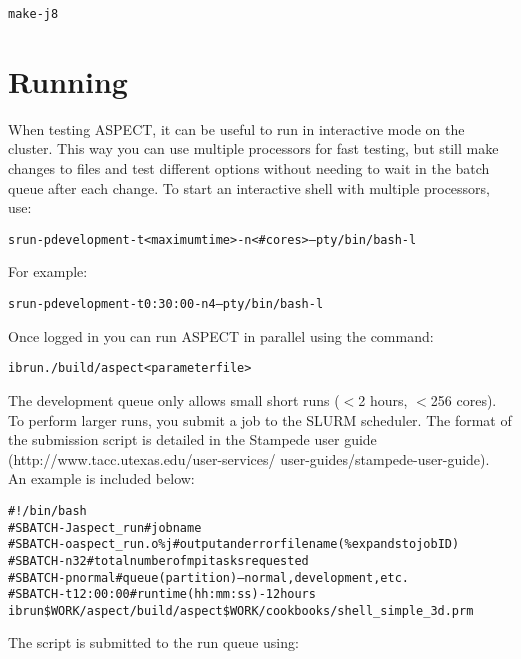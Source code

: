 \documentclass[12pt]{article}
\begin{document}
 \begin{alltt}\footnotesize
make -j8 
 \end{alltt}

\section{Running}
When testing ASPECT, it can be useful to run in interactive mode on the cluster. This way you can use multiple processors for fast testing, but still make changes to files and test different options without needing to wait in the batch queue after each change. To start an interactive shell with multiple processors, use: \\

 \begin{alltt}\footnotesize
srun -p development -t <maximum time> -n <\#cores> --pty /bin/bash -l \\
 \end{alltt}
 
For example: 
 \begin{alltt}\footnotesize
srun -p development -t 0:30:00 -n 4 --pty /bin/bash -l 
 \end{alltt}
 
Once logged in you can run ASPECT in parallel using the command:
 
  \begin{alltt}\footnotesize
 ibrun ./build/aspect <parameter file> 
  \end{alltt}
 
 The development queue only allows small short runs ($<$2 hours, $<$256 cores). To perform larger runs, you submit a job to the SLURM scheduler. The format of the submission script is detailed in the Stampede user guide (http://www.tacc.utexas.edu/user-services/ user-guides/stampede-user-guide). An example is included below: \\
 
   \begin{alltt}\footnotesize
\#!/bin/bash 
\#SBATCH -J aspect\_run   \# job name 
\#SBATCH -o aspect\_run.o\%j   \# output and error file name (\% expands to jobID) 
\#SBATCH -n 32  \# total number of mpi tasks requested 
\#SBATCH -p normal \# queue (partition) -- normal, development, etc. 
\#SBATCH -t 12:00:00 \# run time (hh:mm:ss) - 12 hours 
ibrun \$WORK/aspect/build/aspect \$WORK/cookbooks/shell\_simple\_3d.prm 
  \end{alltt}

The script is submitted to the run queue using: \\
 
\end{document}
